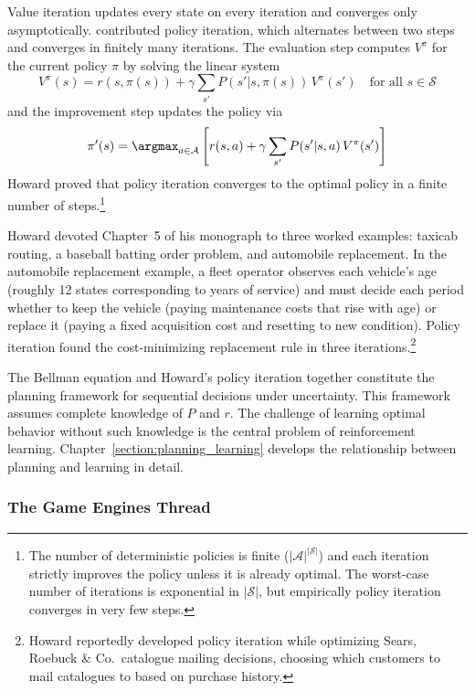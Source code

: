 Value iteration updates every state on every iteration and converges only asymptotically. \citet{howard1960} contributed policy iteration, which alternates between two steps and converges in finitely many iterations. The evaluation step computes $V^\pi$ for the current policy $\pi$ by solving the linear system
\begin{equation}
V^\pi(s) = r(s, \pi(s)) + \gamma \sum_{s'} P(s'|s, \pi(s)) \, V^\pi(s') \quad \text{for all } s \in \mathcal{S}
\end{equation}
and the improvement step updates the policy via
\begin{equation}
\pi'(s) = \argmax_{a \in \mathcal{A}} \left[ r(s,a) + \gamma \sum_{s'} P(s'|s,a) \, V^\pi(s') \right]
\end{equation}
Howard proved that policy iteration converges to the optimal policy in a finite number of steps.\footnote{The number of deterministic policies is finite ($|\mathcal{A}|^{|\mathcal{S}|}$) and each iteration strictly improves the policy unless it is already optimal. The worst-case number of iterations is exponential in $|\mathcal{S}|$, but empirically policy iteration converges in very few steps.}

Howard devoted Chapter~5 of his monograph to three worked examples: taxicab routing, a baseball batting order problem, and automobile replacement. In the automobile replacement example, a fleet operator observes each vehicle's age (roughly 12 states corresponding to years of service) and must decide each period whether to keep the vehicle (paying maintenance costs that rise with age) or replace it (paying a fixed acquisition cost and resetting to new condition). Policy iteration found the cost-minimizing replacement rule in three iterations.\footnote{Howard reportedly developed policy iteration while optimizing Sears, Roebuck \& Co.\ catalogue mailing decisions, choosing which customers to mail catalogues to based on purchase history.}

The Bellman equation and Howard's policy iteration together constitute the planning framework for sequential decisions under uncertainty. This framework assumes complete knowledge of $P$ and $r$. The challenge of learning optimal behavior without such knowledge is the central problem of reinforcement learning. Chapter~\ref{section:planning_learning} develops the relationship between planning and learning in detail.

\subsubsection{The Game Engines Thread}

